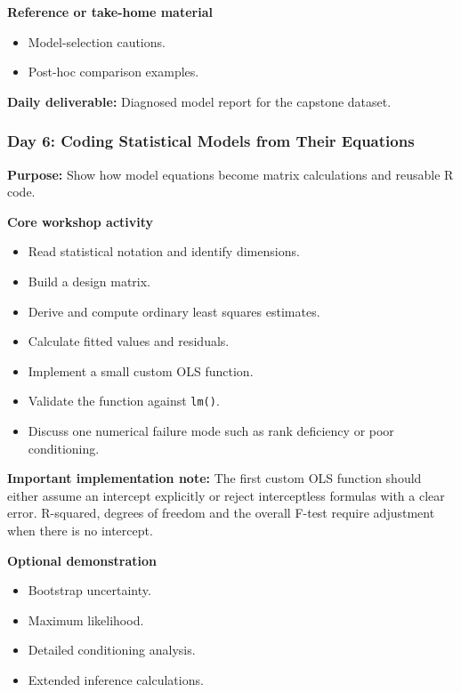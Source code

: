 \documentclass[11pt]{article}
\providecommand{\tightlist}{%
  \setlength{\itemsep}{0pt}\setlength{\parskip}{0pt}}
\begin{document}
\textbf{Reference or take-home material}

\begin{itemize}
\tightlist
\item
  Model-selection cautions.
\item
  Post-hoc comparison examples.
\end{itemize}

\textbf{Daily deliverable:} Diagnosed model report for the capstone
dataset.

\hypertarget{day-6-coding-statistical-models-from-their-equations}{%
\subsubsection{Day 6: Coding Statistical Models from Their
Equations}\label{day-6-coding-statistical-models-from-their-equations}}

\textbf{Purpose:} Show how model equations become matrix calculations
and reusable R code.

\textbf{Core workshop activity}

\begin{itemize}
\tightlist
\item
  Read statistical notation and identify dimensions.
\item
  Build a design matrix.
\item
  Derive and compute ordinary least squares estimates.
\item
  Calculate fitted values and residuals.
\item
  Implement a small custom OLS function.
\item
  Validate the function against \texttt{lm()}.
\item
  Discuss one numerical failure mode such as rank deficiency or poor
  conditioning.
\end{itemize}

\textbf{Important implementation note:} The first custom OLS function
should either assume an intercept explicitly or reject interceptless
formulas with a clear error. R-squared, degrees of freedom and the
overall F-test require adjustment when there is no intercept.

\textbf{Optional demonstration}

\begin{itemize}
\tightlist
\item
  Bootstrap uncertainty.
\item
  Maximum likelihood.
\item
  Detailed conditioning analysis.
\item
  Extended inference calculations.
\end{itemize}
\end{document}
